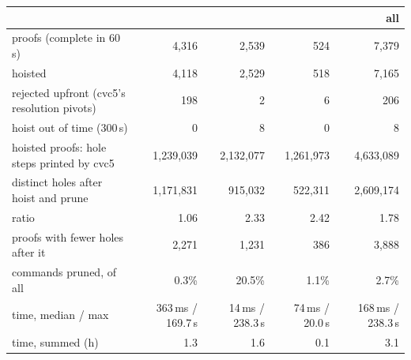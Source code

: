 \begin{tabular}{lrrrr}
\toprule
 & \UF{} & \LIA{} & \LRA{} & all \\
\midrule
proofs (complete in 60\,s) & 4,316 & 2,539 & 524 & 7,379 \\
\quad hoisted & 4,118 & 2,529 & 518 & 7,165 \\
\quad rejected upfront (cvc5's resolution pivots) & 198 & 2 & 6 & 206 \\
\quad hoist out of time (300\,s) & 0 & 8 & 0 & 8 \\
\midrule
hoisted proofs: hole steps printed by cvc5 & 1,239,039 & 2,132,077 & 1,261,973 & 4,633,089 \\
\quad distinct holes after hoist and prune & 1,171,831 & 915,032 & 522,311 & 2,609,174 \\
\quad ratio & 1.06 & 2.33 & 2.42 & 1.78 \\
\quad proofs with fewer holes after it & 2,271 & 1,231 & 386 & 3,888 \\
\quad commands pruned, of all & 0.3\% & 20.5\% & 1.1\% & 2.7\% \\
\quad time, median / max & 363\,ms / 169.7\,s & 14\,ms / 238.3\,s & 74\,ms / 20.0\,s & 168\,ms / 238.3\,s \\
\quad time, summed (h) & 1.3 & 1.6 & 0.1 & 3.1 \\
\bottomrule
\end{tabular}
